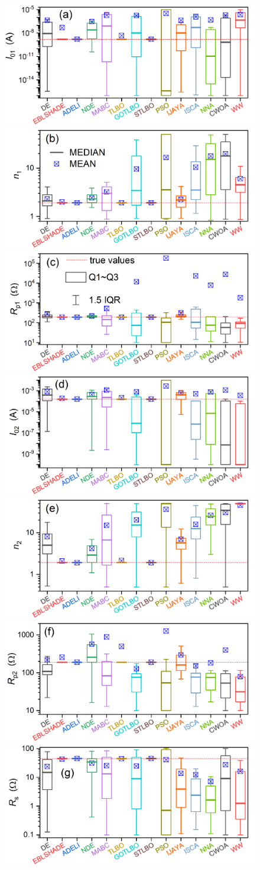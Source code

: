 \documentclass[a4paper,fleqn]{cas-sc}
\begin{document}
\begin{figure}[]
	\centering
        \includegraphics[width=.45\textwidth]{Fig4a}
        \includegraphics[width=.45\textwidth]{Fig4b}
        \includegraphics[width=.45\textwidth]{Fig4c}
        \includegraphics[width=.45\textwidth]{Fig4d}
        \includegraphics[width=.45\textwidth]{Fig4e}
        \includegraphics[width=.45\textwidth]{Fig4f}
        \includegraphics[width=.45\textwidth]{Fig4g}

\end{figure}
\end{document}
